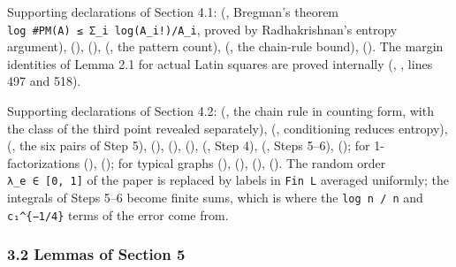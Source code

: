 \documentclass[english,11pt,a4paper]{article}
\begin{document}
Supporting declarations of Section 4.1:  (, Bregman's theorem \texttt{log\ \#PM(A)\ ≤\ Σ\_i\ log(\textbar{}A\_i\textbar{}!)/\textbar{}A\_i\textbar{}}, proved by Radhakrishnan's entropy argument),  (),  (),  (, the pattern count),  (, the chain-rule bound),  (). The margin identities of Lemma 2.1 for actual Latin squares are proved internally (, , lines 497 and 518).

Supporting declarations of Section 4.2:  (, the chain rule in counting form, with the class of the third point revealed separately),  (, conditioning reduces entropy),  (, the six pairs of Step 5),  (),  (),  (),  (, Step 4),  (, Steps 5--6),  (); for 1-factorizations  (),  (); for typical graphs  (),  (),  (),  (). The random order \texttt{λ\_e\ ∈\ {[}0,\ 1{]}} of the paper is replaced by labels in \texttt{Fin\ L} averaged uniformly; the integrals of Steps 5--6 become finite sums, which is where the \texttt{log\ n\ /\ n} and \texttt{c₁\^{}\{−1/4\}} terms of the error come from.

\subsubsection{3.2 Lemmas of Section 5}\label{lemmas-of-section-5}
\end{document}
